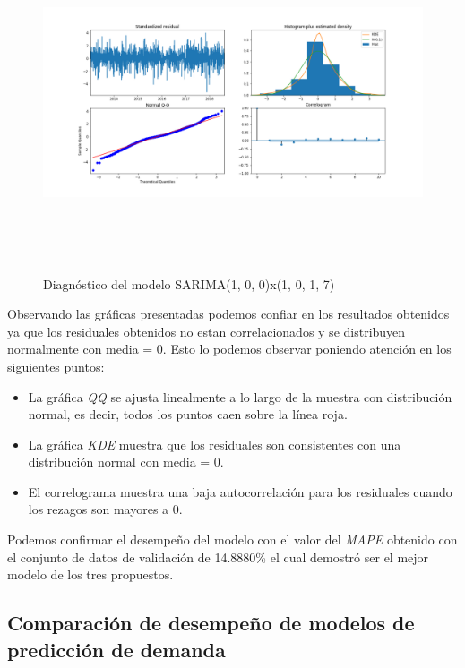 \begin{figure}[H]
  \centering
      \includegraphics[width=\maxwidth,height=10cm]{figures/sarimax_summary.png}  
  \caption{Diagnóstico del modelo SARIMA(1, 0, 0)x(1, 0, 1, 7)}
\end{figure}


Observando las gráficas presentadas podemos confiar en los resultados obtenidos ya que los residuales obtenidos no estan correlacionados y se distribuyen normalmente con media = 0. Esto lo podemos observar poniendo atención en los siguientes puntos:

\begin{itemize}
  \item La gráfica \emph{QQ} se ajusta linealmente a lo largo de la muestra con distribución normal, es decir, todos los puntos caen sobre la línea roja.
  \item La gráfica \emph{KDE} muestra que los residuales son consistentes con una distribución normal con media = 0.
  \item El correlograma muestra una baja autocorrelación para los residuales cuando los rezagos son mayores a 0.
\end{itemize}

Podemos confirmar el desempeño del modelo con el valor del \emph{MAPE} obtenido con el conjunto de datos de validación de 14.8880\% el cual demostró ser el mejor modelo de los tres propuestos.

\subsection*{Comparación de desempeño de modelos de predicción de demanda}

